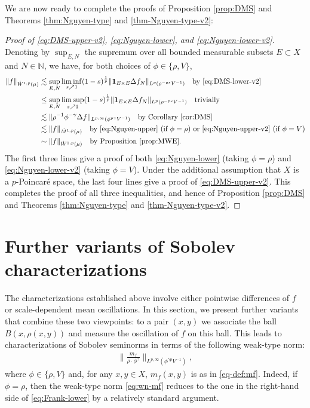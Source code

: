 \documentclass[11pt]{amsart}
\theoremstyle{definition}
\theoremstyle{remark}
\numberwithin{equation}{section}
\newcommand{\Norm}[2]{\|#1\|_{#2}}
\begin{document}
We are now ready to complete the proofs of Proposition \ref{prop:DMS} and Theorems
\ref{thm:Nguyen-type} and \ref{thm-Nguyen-type-v2}:

\begin{proof}[Proof of \eqref{eq:DMS-upper-v2}, \eqref{eq:Nguyen-lower}, and
\eqref{eq:Nguyen-lower-v2}]
Denoting by $\sup_{E,N}$ the supremum over all bounded measurable subsets $E\subset X$ and
$N\in\mathbb N$, we have, for both choices of $\phi\in\{\rho,V\}$,
\begin{equation*}
\begin{split}
  \Norm{f}{\dot W^{1,p}(\mu)}
  &\lesssim\sup_{E,N}\liminf_{s\nearrow 1} (1-s)^{\frac1p}\Norm{\mathbf{1}_{E\times E}\Delta
  f_N}{L^p(\rho^{-ps}V^{-1})}
  \quad\text{by \eqref{eq:DMS-lower-v2}} \\
  &\leq\sup_{E,N}\limsup_{s\nearrow 1} (1-s)^{\frac1p}\Norm{\mathbf{1}_{E\times E}\Delta
  f_N}{L^p(\rho^{-ps}V^{-1})}
  \quad\text{trivially} \\
  &\lesssim\Norm{\rho^{-1}\phi^{-\gamma}\Delta f}{L^{p,\infty}(\phi^{p\gamma}V^{-1})}
  \quad\text{by Corollary \ref{cor:DMS}} \\
  &\lesssim\Norm{f}{\dot M^{1,p}(\mu)}\quad\text{by \eqref{eq:Nguyen-upper} (if $\phi=\rho$)
  or
    \eqref{eq:Nguyen-upper-v2} (if $\phi=V$)} \\
  &\sim\Norm{f}{\dot W^{1,p}(\mu)}\quad\text{by Proposition \ref{prop:MWE}}.
\end{split}
\end{equation*}
The first three lines give a proof of both \eqref{eq:Nguyen-lower} (taking $\phi=\rho$)
and \eqref{eq:Nguyen-lower-v2} (taking $\phi=V$). Under the additional assumption that $X$
is a $p$-Poincar\'e space, the last four lines give a proof of \eqref{eq:DMS-upper-v2}.
This completes the proof of all three inequalities, and hence of Proposition
\ref{prop:DMS} and Theorems \ref{thm:Nguyen-type} and \ref{thm-Nguyen-type-v2}.
\end{proof}


\section{Further variants of Sobolev characterizations}\label{sec:further-variants}

The characterizations established above involve either pointwise differences
of $f$ or scale-dependent mean oscillations. In this section, we present
further variants that combine these two viewpoints: to a pair $(x,y)$ we
associate the ball $B(x,\rho(x,y))$ and measure the oscillation of $f$ on this
ball. This leads to characterizations of Sobolev seminorms in terms of the
following weak-type norm:
\begin{align}\label{eq:wn-mf}
\Big\|\frac{m_f}{\rho \cdot\phi^\gamma}\Big\|_{L^{p,\infty}(\phi^{\gamma p}V^{-1})},
\end{align}
where $\phi\in\{\rho,V\}$ and, for any $x,y\in X$,
$m_f(x,y)$ is as in \eqref{eq-def:mf}.
Indeed, if $\phi=\rho$, then the weak-type norm \eqref{eq:wn-mf}
reduces to the one in the right-hand side of \eqref{eq:Frank-lower}
by a relatively standard argument.
\end{document}
